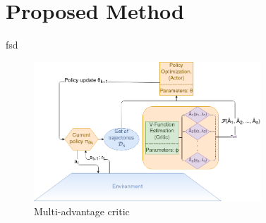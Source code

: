 \section{Proposed Method}
\label{sec:method}



fsd 
\begin{figure}[!htb]
\includegraphics[width=8.5cm]{images/model}
\caption{Multi-advantage critic}
\label{fig:model}
\end{figure}
